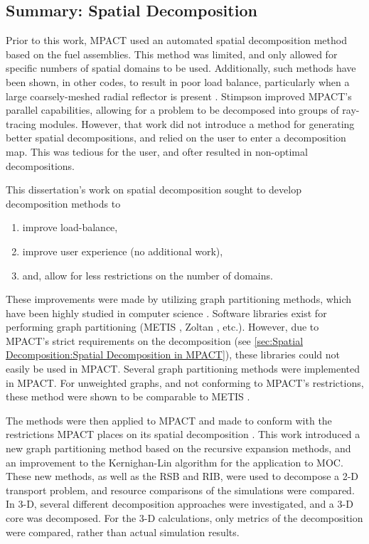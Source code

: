 {{    \subsection{Summary: Spatial Decomposition}{\label{ssec:Summary:Spatial Decomposition}
      Prior to this work, MPACT \cite{MPACT2016} used an automated spatial decomposition method based on the fuel assemblies.
      This method was limited, and only allowed for specific numbers of spatial domains to be used.
      Additionally, such methods have been shown, in other codes, to result in poor load balance, particularly when a large coarsely-meshed radial reflector is present \cite{Gunow2018}.
      Stimpson \cite{StimpsonPartitioning2017} improved MPACT's parallel capabilities, allowing for a problem to be decomposed into groups of ray-tracing modules.
      However, that work did not introduce a method for generating better spatial decompositions, and relied on the user to enter a decomposition map.
      This was tedious for the user, and ofter resulted in non-optimal decompositions.

      This dissertation's work on spatial decomposition sought to develop decomposition methods to
      \begin{enumerate}
        \item{improve load-balance,}
        \item{improve user experience (no additional work),}
        \item{and, allow for less restrictions on the number of domains.}
      \end{enumerate}
      These improvements were made by utilizing graph partitioning methods, which have been highly studied in computer science \cite{Elsner1997}.
      Software libraries exist for performing graph partitioning (METIS \cite{METIS}, Zoltan \cite{Boman2012}, etc.).
      However, due to MPACT's strict requirements on the decomposition (see \cref{sec:Spatial Decomposition:Spatial Decomposition in MPACT}), these libraries could not easily be used in MPACT.
      Several graph partitioning methods were implemented in MPACT.
      For unweighted graphs, and not conforming to MPACT's restrictions, these method were shown to be comparable to METIS \cite{Fitzgerald2017}.

      The methods were then applied to MPACT and made to conform with the restrictions MPACT places on its spatial decomposition \cite{Fitzgerald2019a}.
      This work introduced a new graph partitioning method based on the recursive expansion methods, and an improvement to the Kernighan-Lin \cite{Kernighan1970} algorithm for the application to \ac{MOC}.
      These new methods, as well as the \acf{RSB} and \acf{RIB}, were used to decompose a 2-D transport problem, and resource comparisons of the simulations were compared.
      In 3-D, several different decomposition approaches were investigated, and a 3-D core was decomposed.
      For the 3-D calculations, only metrics of the decomposition were compared, rather than actual simulation results.
    }

}}
